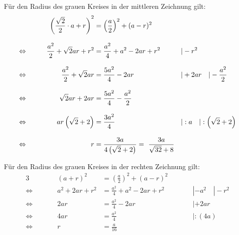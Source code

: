 \begin{exercise}
    Für den Radius des grauen Kreises in der mittleren Zeichnung gilt:
    \begin{alignat*}{3}
                     &\qquad & \left(\frac{\sqrt{2}}{2}\cdot a+r\right)^2   &=\left(\frac{a}{2}\right)^2+(a-r)^2  & \qquad&                                  \\[2ex]
      \Leftrightarrow&\qquad &               \frac{a^2}{2}+\sqrt{2}ar+r^2   &=\frac{ a^2}{4}+a^2-2ar+r^2          & \qquad&|-r^2                             \\[2ex]
      \Leftrightarrow&\qquad &               \frac{a^2}{2}+\sqrt{2}ar       &=\frac{5a^2}{4}    -2ar              & \qquad&|+2ar\quad|-\frac{a^2}{2}         \\[2ex]
      \Leftrightarrow&\qquad &                             \sqrt{2}ar+2ar   &=\frac{5a^2}{4}-\frac{a^2}{2}        & \qquad&                                  \\[2ex]
      \Leftrightarrow&\qquad &                     ar\left(\sqrt{2}+2\right)&=\frac{3a^2}{4}                      & \qquad&|:a\quad|:\left(\sqrt{2}+2\right) \\[2ex]
      \Leftrightarrow&\qquad &                      r                       &=\frac{3a}{4\left(\sqrt{2}+2\right)}
                                                                             =\fakewidth{\frac{3a}{\sqrt{32}+8}}  & \qquad&
    \end{alignat*}

    Für den Radius des grauen Kreises in der rechten Zeichnung gilt:
    \begin{alignat*}{3}
                     &\qquad & (a+r)^2     &=\left(\frac{a}{2}\right)^2+(a-r)^2 & \qquad&                \\[2ex]
      \Leftrightarrow&\qquad & a^2+2ar+r^2 &=\frac{a^2}{4}+a^2-2ar+r^2          & \qquad&|-a^2\quad|-r^2 \\[2ex]
      \Leftrightarrow&\qquad &     2ar     &=\frac{a^2}{4}    -2ar              & \qquad&|+2ar           \\[2ex]
      \Leftrightarrow&\qquad &     4ar     &=\frac{a^2}{4}                      & \qquad&|:(4a)          \\[2ex]
      \Leftrightarrow&\qquad &       r     &=\frac{a}{16}                       & \qquad&
    \end{alignat*}
  \fi
\end{exercise}

